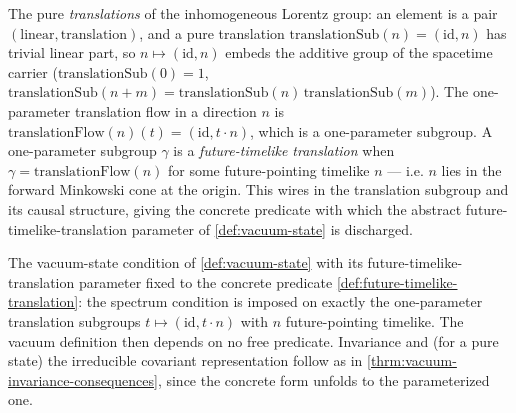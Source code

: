 \begin{definition}
    \label{def:future-timelike-translation}
    \leanok
    The pure \emph{translations} of the inhomogeneous Lorentz group: an element is a pair $(\text{linear}, \text{translation})$, and a pure translation $\mathrm{translationSub}(n) = (\mathrm{id}, n)$ has trivial linear part, so $n \mapsto (\mathrm{id}, n)$ embeds the additive group of the spacetime carrier ($\mathrm{translationSub}(0) = 1$, $\mathrm{translationSub}(n+m) = \mathrm{translationSub}(n)\,\mathrm{translationSub}(m)$). The one-parameter translation flow in a direction $n$ is $\mathrm{translationFlow}(n)(t) = (\mathrm{id}, t \cdot n)$, which is a one-parameter subgroup. A one-parameter subgroup $\gamma$ is a \emph{future-timelike translation} when $\gamma = \mathrm{translationFlow}(n)$ for some future-pointing timelike $n$ --- i.e. $n$ lies in the forward Minkowski cone at the origin. This wires in the translation subgroup and its causal structure, giving the concrete predicate with which the abstract future-timelike-translation parameter of \ref{def:vacuum-state} is discharged.
\end{definition}

\begin{definition}
    \label{def:vacuum-state-concrete}
    \leanok
    The vacuum-state condition of \ref{def:vacuum-state} with its future-timelike-translation parameter fixed to the concrete predicate \ref{def:future-timelike-translation}: the spectrum condition is imposed on exactly the one-parameter translation subgroups $t \mapsto (\mathrm{id}, t \cdot n)$ with $n$ future-pointing timelike. The vacuum definition then depends on no free predicate. Invariance and (for a pure state) the irreducible covariant representation follow as in \ref{thrm:vacuum-invariance-consequences}, since the concrete form unfolds to the parameterized one.
\end{definition}

